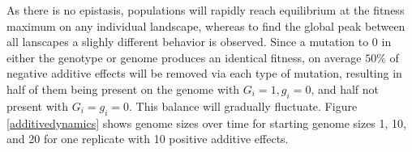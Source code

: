 \documentclass[paper=a4, fontsize=11pt,twoside]{scrartcl}       %
\begin{document}
As there is no epistasis, populations will rapidly reach equilibrium at the fitness maximum on any individual landscape, whereas to find the global peak between all lanscapes a slighly different behavior is observed. Since a mutation to $0$ in either the genotype or genome produces an identical fitness, on average $50\%$ of negative additive effects will be removed via each type of mutation, resulting in half of them being present on the genome with $G_i = 1, g_i = 0$, and half not present with $G_i = g_i = 0$. This balance will gradually fluctuate. Figure \ref{additivedynamics} shows genome sizes over time for starting genome sizes 1, 10, and 20 for one replicate with 10 positive additive effects. 

\begin{figure}[h!]
	\centering
	\\

\end{figure}
\end{document}
